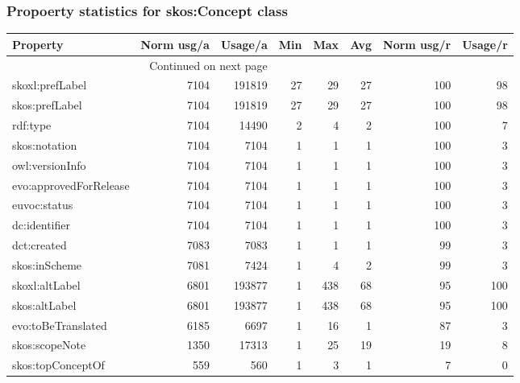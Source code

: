 \documentclass[10pt,a4paper,titlepage,final]{article}
\begin{document}
\subsubsection{Propoerty statistics for skos:Concept class}
\begin{longtable}{lrrrrrrr}
\toprule
               Property &  Norm usg/a &  Usage/a &  Min &  Max &  Avg &  Norm usg/r &  Usage/r \\
\midrule
\endhead
\midrule
\multicolumn{3}{r}{{Continued on next page}} \\
\midrule
\endfoot

\bottomrule
\endlastfoot
        skoxl:prefLabel &        7104 &   191819 &   27 &   29 &   27 &         100 &       98 \\
         skos:prefLabel &        7104 &   191819 &   27 &   29 &   27 &         100 &       98 \\
               rdf:type &        7104 &    14490 &    2 &    4 &    2 &         100 &        7 \\
          skos:notation &        7104 &     7104 &    1 &    1 &    1 &         100 &        3 \\
        owl:versionInfo &        7104 &     7104 &    1 &    1 &    1 &         100 &        3 \\
 evo:approvedForRelease &        7104 &     7104 &    1 &    1 &    1 &         100 &        3 \\
           euvoc:status &        7104 &     7104 &    1 &    1 &    1 &         100 &        3 \\
          dc:identifier &        7104 &     7104 &    1 &    1 &    1 &         100 &        3 \\
            dct:created &        7083 &     7083 &    1 &    1 &    1 &          99 &        3 \\
          skos:inScheme &        7081 &     7424 &    1 &    4 &    2 &          99 &        3 \\
         skoxl:altLabel &        6801 &   193877 &    1 &  438 &   68 &          95 &      100 \\
          skos:altLabel &        6801 &   193877 &    1 &  438 &   68 &          95 &      100 \\
     evo:toBeTranslated &        6185 &     6697 &    1 &   16 &    1 &          87 &        3 \\
         skos:scopeNote &        1350 &    17313 &    1 &   25 &   19 &          19 &        8 \\
      skos:topConceptOf &         559 &      560 &    1 &    3 &    1 &           7 &        0 \\

\end{longtable}
\end{document}
